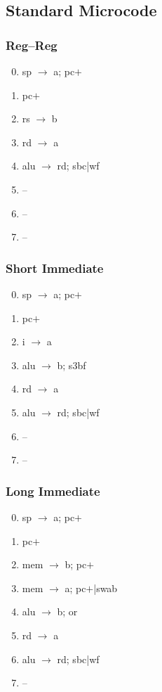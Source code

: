 \documentclass[11pt]{book}
\begin{document}
\subsection*{Standard Microcode}
\begin{multicols}{3}\ttfamily\selectfont\small
  \subsubsection*{Reg--Reg}
  \begin{enumerate}\setcounter{enumi}{-1}
  \item sp \(\rightarrow\) a; pc\(+\)
  \item pc\(+\)
  \item rs \(\rightarrow\) b
  \item rd \(\rightarrow\) a
  \item alu \(\rightarrow\) rd; sbc|wf
  \item --
  \item --
  \item --
  \end{enumerate}
  \columnbreak
  \subsubsection*{Short Immediate}
  \begin{enumerate}\setcounter{enumi}{-1}
  \item sp \(\rightarrow\) a; pc\(+\)
  \item pc\(+\)
  \item i \(\rightarrow\) a
  \item alu \(\rightarrow\) b; s3bf
  \item rd \(\rightarrow\) a
  \item alu \(\rightarrow\) rd; sbc|wf
  \item --
  \item --
  \end{enumerate}
  \columnbreak
  \subsubsection*{Long Immediate}
  \begin{enumerate}\setcounter{enumi}{-1}
  \item sp \(\rightarrow\) a; pc\(+\)
  \item pc\(+\)
  \item mem \(\rightarrow\) b; pc\(+\)
  \item mem \(\rightarrow\) a; pc\(+\)|swab
  \item alu \(\rightarrow\) b; or
  \item rd \(\rightarrow\) a
  \item alu \(\rightarrow\) rd; sbc|wf
  \item --
  \end{enumerate}
\end{multicols}
\end{document}
